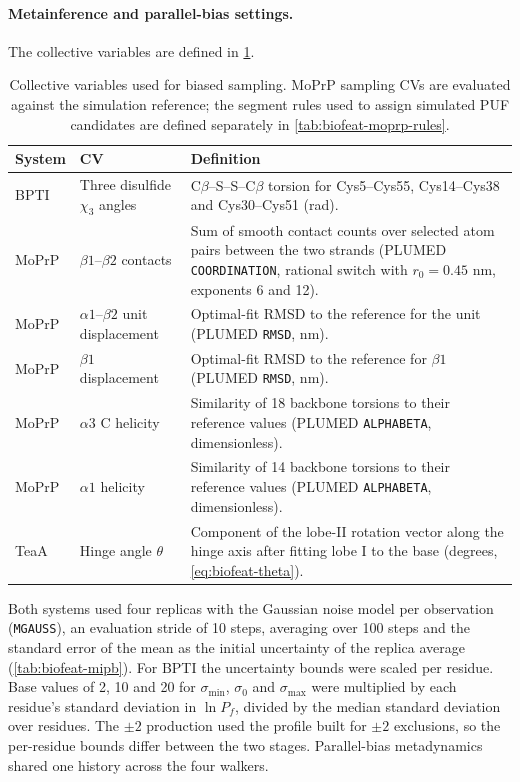 \paragraph{Metainference and parallel-bias settings.}
The collective variables are defined in \cref{tab:biofeat-cvs}.

\begin{table}[htbp]
    \centering
    \small
    \begin{tabularx}{\textwidth}{@{}l>{\raggedright\arraybackslash}p{}>{\raggedright\arraybackslash}X@{}}
    \toprule
        \textbf{System} & \textbf{CV} & \textbf{Definition} \\
    \midrule
        BPTI & Three disulfide $\chi_3$ angles & C$\beta$--S--S--C$\beta$ torsion for Cys5--Cys55, Cys14--Cys38 and Cys30--Cys51 (rad). \\
        MoPrP & $\beta1$--$\beta2$ contacts & Sum of smooth contact counts over selected atom pairs between the two strands (PLUMED \texttt{COORDINATION}, rational switch with $r_0=0.45$ nm, exponents 6 and 12). \\
        MoPrP & $\alpha1$--$\beta2$ unit displacement & Optimal-fit RMSD to the reference for the unit (PLUMED \texttt{RMSD}, nm). \\
        MoPrP & $\beta1$ displacement & Optimal-fit RMSD to the reference for $\beta1$ (PLUMED \texttt{RMSD}, nm). \\
        MoPrP & $\alpha3$ C helicity & Similarity of 18 backbone torsions to their reference values (PLUMED \texttt{ALPHABETA}, dimensionless). \\
        MoPrP & $\alpha1$ helicity & Similarity of 14 backbone torsions to their reference values (PLUMED \texttt{ALPHABETA}, dimensionless). \\
        TeaA & Hinge angle $\theta$ & Component of the lobe-II rotation vector along the hinge axis after fitting lobe I to the base (degrees, \cref{eq:biofeat-theta}). \\
    \bottomrule
    \end{tabularx}
    \caption{Collective variables used for biased sampling. MoPrP sampling CVs are evaluated against the simulation reference; the segment rules used to assign simulated PUF candidates are defined separately in \cref{tab:biofeat-moprp-rules}.}
    \label{tab:biofeat-cvs}
\end{table}

Both systems used four replicas with the Gaussian noise model per observation (\texttt{MGAUSS}), an evaluation stride of 10 steps, averaging over 100 steps and the standard error of the mean as the initial uncertainty of the replica average (\cref{tab:biofeat-mipb}). For BPTI the uncertainty bounds were scaled per residue. Base values of 2, 10 and 20 for $\sigma_\mathrm{min}$, $\sigma_0$ and $\sigma_\mathrm{max}$ were multiplied by each residue's standard deviation in $\ln P_f$, divided by the median standard deviation over residues. The $\pm2$ production used the profile built for $\pm2$ exclusions, so the per-residue bounds differ between the two stages. Parallel-bias metadynamics shared one history across the four walkers.

